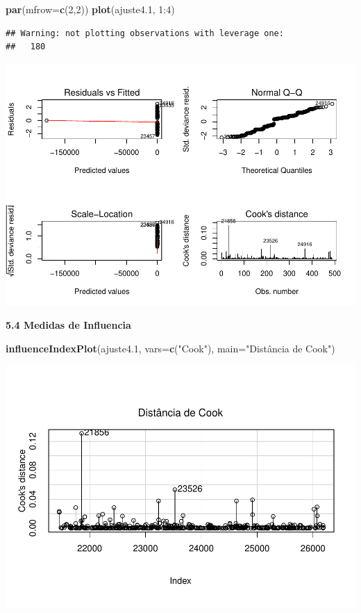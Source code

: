 \documentclass[]{article}
\newenvironment{Shaded}{\begin{snugshade}}{\end{snugshade}}
\newcommand{\KeywordTok}[1]{\textcolor[rgb]{0.13,0.29,0.53}{\textbf{{#1}}}}
\newcommand{\DataTypeTok}[1]{\textcolor[rgb]{0.13,0.29,0.53}{{#1}}}
\newcommand{\DecValTok}[1]{\textcolor[rgb]{0.00,0.00,0.81}{{#1}}}
\newcommand{\FloatTok}[1]{\textcolor[rgb]{0.00,0.00,0.81}{{#1}}}
\newcommand{\StringTok}[1]{\textcolor[rgb]{0.31,0.60,0.02}{{#1}}}
\newcommand{\NormalTok}[1]{{#1}}
\begin{document}
\begin{Shaded}
\begin{Highlighting}[]
\KeywordTok{par}\NormalTok{(}\DataTypeTok{mfrow=}\KeywordTok{c}\NormalTok{(}\DecValTok{2}\NormalTok{,}\DecValTok{2}\NormalTok{))}
\KeywordTok{plot}\NormalTok{(ajuste4}\FloatTok{.1}\NormalTok{, }\DecValTok{1}\NormalTok{:}\DecValTok{4}\NormalTok{)}
\end{Highlighting}
\end{Shaded}

\begin{verbatim}
## Warning: not plotting observations with leverage one:
##   180
\end{verbatim}

\includegraphics{Dados_Binários1_files/figure-latex/unnamed-chunk-17-1.pdf}

\textbf{5.4 Medidas de Influencia}

\begin{Shaded}
\begin{Highlighting}[]
\KeywordTok{influenceIndexPlot}\NormalTok{(ajuste4}\FloatTok{.1}\NormalTok{, }\DataTypeTok{vars=}\KeywordTok{c}\NormalTok{(}\StringTok{"Cook"}\NormalTok{), }\DataTypeTok{main=}\StringTok{"Distância de Cook"}\NormalTok{)}
\end{Highlighting}
\end{Shaded}

\includegraphics{Dados_Binários1_files/figure-latex/unnamed-chunk-18-1.pdf}
\end{document}
